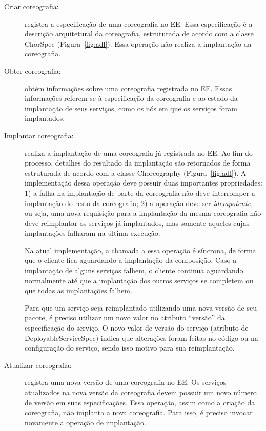 \begin{description}

\item [Criar coreografia:] registra a especificação de uma coreografia no EE. 
Essa especificação é a descrição arquitetural da coreografia, 
estruturada de acordo com a classe \textsf{ChorSpec} (Figura~\ref{fig:adl}). 
Essa operação não realiza a implantação da coreografia.

\item [Obter coreografia:] obtém informações sobre uma coreografia registrada no EE. 
Essas informações referem-se à especificação da coreografia e ao estado da implantação 
de seus serviços, como os nós em que os serviços foram implantados.

\item [Implantar coreografia:] realiza a implantação de uma coreografia já registrada no EE. 
Ao fim do processo, detalhes do resultado da implantação são retornados de forma estruturada 
de acordo com a classe \textsf{Choreography} (Figura~\ref{fig:adl}).
A implementação dessa operação deve possuir duas importantes propriedades: 
1) a falha na implantação de parte da coreografia não deve interromper a implantação do resto da coreografia; 
2) a operação deve ser \emph{idempotente}, ou seja, uma nova requisição para a implantação da mesma 
coreografia não deve reimplantar os serviços já implantados, 
mas somente aqueles cujas implantações falharam na última execução. 

Na atual implementação, a chamada a essa operação é síncrona, de forma que o cliente fica 
aguardando a implantação da composição. Caso a implantação de alguns serviços falhem,
o cliente continua aguardando normalmente até que a implantação dos outros serviços se completem
ou que todas as implantações falhem.

Para que um serviço seja reimplantado utilizando uma nova versão de seu pacote,
é preciso utilizar um novo valor no atributo ``versão'' da especificação do serviço. 
O novo valor de versão do serviço (atributo de \textsf{DeployableServiceSpec})
indica que alterações foram feitas no código ou na configuração do serviço,
sendo isso motivo para sua reimplantação.

\item [Atualizar coreografia:] registra uma nova versão de uma coreografia no EE. 
Os serviços atualizados na nova versão da coreografia devem possuir 
um novo número de versão em suas especificações. 
Essa operação, assim como a criação da coreografia, não implanta a nova coreografia. 
Para isso, é preciso invocar novamente a operação de implantação.


\end{description}
